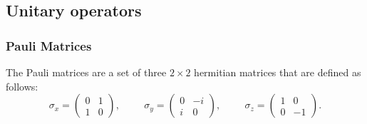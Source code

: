 \subsection{Unitary operators}\label{subsec:unitary-operators}




\subsubsection{Pauli Matrices}
\begin{definition}
The Pauli matrices are a set of three $2 \times 2$ hermitian matrices that are defined as follows:
\begin{equation*}
  \sigma_{x} = \begin{pmatrix} 0 & 1\\ 1 & 0 \end{pmatrix}, \hspace{1cm} \sigma_{y} = \begin{pmatrix} 0 & -i\\ i & 0 \end{pmatrix}, \hspace{1cm} \sigma_{z} = \begin{pmatrix} 1 & 0\\ 0 & -1 \end{pmatrix}.
\end{equation*}
\end{definition}

